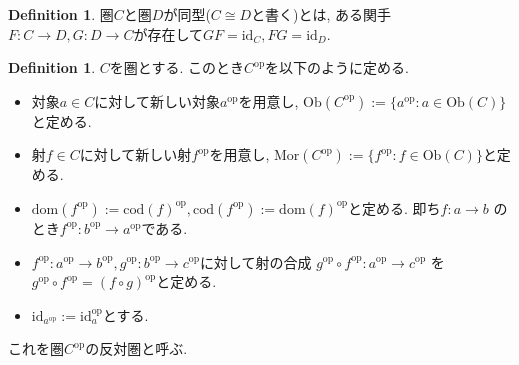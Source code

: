 \documentclass[a4paper,10pt]{article}
\theoremstyle{definition}
\newtheorem{definition}[thm]{\bfseries Definition}
\begin{document}
\begin{definition}
    圏$C$と圏$D$が同型($C \cong D$と書く)とは, ある関手$F: C \rightarrow D,
    G: D \rightarrow C$が存在して$GF= \mathrm{\mathrm{id}}_C, FG=\mathrm{id}_D$.
\end{definition}
\begin{definition}
    $C$を圏とする. このとき$C^{\mathrm{op}}$を以下のように定める.
    \begin{itemize}
        \item 対象$a \in C$に対して新しい対象$a^{\mathrm{op}}$を用意し, $\mathrm{Ob}(C^{\mathrm{op}})
        := \{a^{\mathrm{op}}:a \in \mathrm{Ob}(C)\}$と定める. 
        \item 射$f \in C$に対して新しい射$f^{\mathrm{op}}$を用意し, $\mathrm{Mor}(C^{\mathrm{op}})
        := \{f^{\mathrm{op}}:f \in \mathrm{Ob}(C)\}$と定める. 
        \item $\mathrm{dom}(f^{\mathrm{op}}):=\mathrm{cod}(f)^{\mathrm{op}}, 
        \mathrm{cod}(f^{\mathrm{op}}):=\mathrm{dom}(f)^{\mathrm{op}}$と定める. 即ち$f:a \rightarrow b$
        のとき$f^{\mathrm{op}}: b^{\mathrm{op}} \rightarrow a^{\mathrm{op}}$である.
        \item $f^{\mathrm{op}}:a^{\mathrm{op}} \rightarrow b^{\mathrm{op}}, g^{\mathrm{op}}
        : b^{\mathrm{op}} \rightarrow c^{\mathrm{op}}$に対して射の合成
        $g^{\mathrm{op}}\circ f^{\mathrm{op}}: a^{\mathrm{op}} \rightarrow c^{\mathrm{op}}$
        を $g^{\mathrm{op}}\circ f^{\mathrm{op}}=(f \circ g)^{\mathrm{op}}$と定める.
        \item $\mathrm{id}_{a^{\mathrm{op}}}:= \mathrm{id}_a^{\mathrm{op}}$とする.
    \end{itemize}
    これを圏$C^{\mathrm{op}}$の反対圏と呼ぶ.
\end{definition}
\end{document}
